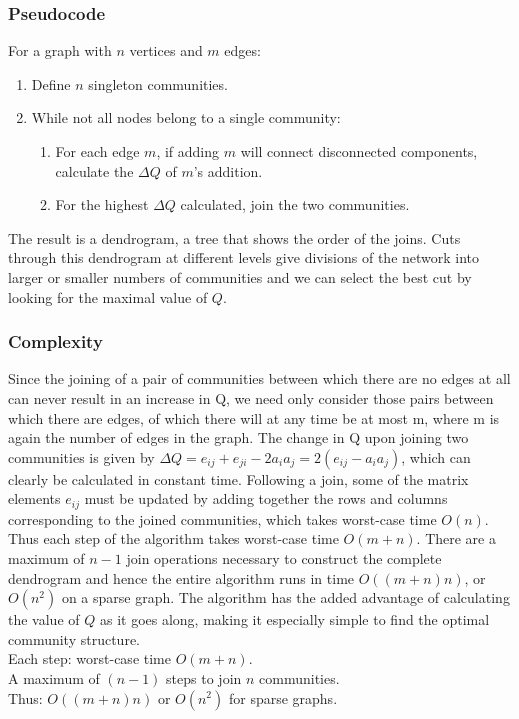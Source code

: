 \documentclass{article}
\begin{document}
\subsubsection{Pseudocode}
For a graph with $n$ vertices and $m$ edges:
\begin{enumerate}
    \item Define $n$ singleton communities.
    \item While not all nodes belong to a single community:
    \begin{enumerate}
        \item For each edge $m$, if adding $m$ will connect disconnected components, calculate the $\Delta Q$ of $m$'s addition.
        \item For the highest $\Delta Q$ calculated, join the two communities.
    \end{enumerate}
\end{enumerate}
The result is a dendrogram, a tree that shows the order of the joins. Cuts through this dendrogram at different levels give divisions of the network into larger or smaller numbers of communities and we can select the best cut by looking for the maximal value of $Q$.
\subsubsection{Complexity}
Since the joining of a pair of communities between which there are no edges at all can never result in an increase in Q, we need only consider those pairs between which there are edges, of which there will at any time be at most m, where m is again the number of edges in the graph. The change in Q upon joining two communities is given by $\Delta Q = e_{ij} + e_{ji} - 2a_{i}a_{j} = 2(e_{ij} - a_{i}a_{j})$, which can clearly be calculated in constant time. Following a join, some of the matrix elements $e_{ij}$ must be updated by adding together the rows and columns corresponding to the joined communities, which takes worst-case time $O(n)$. Thus each step of the algorithm takes worst-case time $O(m + n)$. There are a maximum of $n - 1$ join operations necessary to construct the complete dendrogram and hence the entire algorithm runs in time $O((m + n)n)$, or $O(n^{2})$ on a sparse graph. The algorithm has the added advantage of calculating the value of $Q$ as it goes along, making it especially simple to find the optimal community structure.\\
Each step: worst-case time $O(m + n)$.\\
A maximum of $(n - 1)$ steps to join $n$ communities.\\
Thus: $O((m + n)n)$ or $O(n^{2})$ for sparse graphs.
\end{document}
